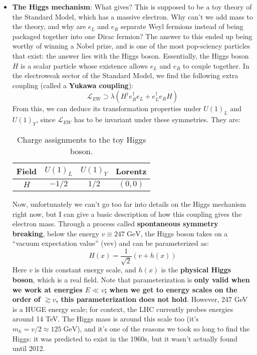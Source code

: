 \documentclass[12pt, oneside]{article}   	%
\theoremstyle{definition}
\begin{document}
\begin{itemize}
	\item \textbf{The Higgs mechanism}: What gives? This is supposed to be a toy theory of the Standard Model, which has a massive electron. Why can't we add mass to the theory, and why are $e_L$ and $e_R$ separate Weyl fermions instead of being packaged together into one Dirac fermion? The answer to this ended up being worthy of winning a Nobel prize, and is one of the most pop-sciency particles that exist: the answer lies with the Higgs boson. Essentially, the Higgs boson $H$ is a scalar particle whose existence allows $e_L$ and $e_R$ to couple together. In the electroweak sector of the Standard Model, we find the following extra coupling (called a \textbf{Yukawa coupling}): 
	\begin{equation}
		\mathcal L_{EW}\supset \lambda (H^\dagger e_R^\dagger e_L + e_L^\dagger e_R H)
	\end{equation}
	From this, we can deduce its transformation properties under $U(1)_L$ and $U(1)_Y$, since $\mathcal L_{EW}$ has to be invariant under these symmetries. They are:
	\begin{table}[H]
    	\setlength{\tabcolsep}{5pt}
		\centering
		\begin{tabular}{ c | ccc } \hline \hline 
		\rule{0cm}{0.4cm} Field & $U(1)_L$ & $U(1)_Y$ & Lorentz \\
		\hline
		\rule{0cm}{0.4cm} $H$ & $-1/2$ & $1/2$ & $(0, 0)$ \\
    		\hline \hline 
		\end{tabular}
		\caption{Charge assignments to the toy Higgs boson. }
		\label{table:charges}
	\end{table}
	Now, unfortunately we can't go too far into details on the Higgs mechanism right now, but I can give a basic description of how this coupling gives the electron mass. Through a process called \textbf{spontaneous symmetry breaking}, below the energy $v \equiv 247\;\mathrm{GeV}$, the Higgs boson takes on a ``vacuum expectation value'' (vev) and can be parameterized as:
	\begin{equation}
		H(x) = \frac{1}{\sqrt{2}} (v + h(x)) \label{eq:higgs_param}
	\end{equation}
	Here $v$ is this constant energy scale, and $h(x)$ is the \textbf{physical Higgs boson}, which is a real field. Note that parameterization is \textbf{only valid when we work at energies $E\ll v$; when we get to energy scales on the order of $\gtrsim v$, this parameterization does not hold}. However,  247 GeV is a HUGE energy scale; for context, the LHC currently probes energies around 14 TeV. The Higgs mass is around this scale too (it's $m_h = v / 2\approx 125\;\mathrm{GeV}$), and it's one of the reasons we took so long to find the Higgs: it was predicted to exist in the 1960s, but it wasn't actually found until 2012. 
	

\end{itemize}
\end{document}
